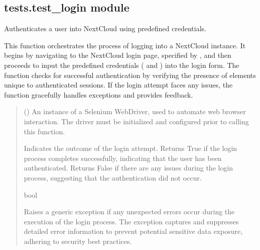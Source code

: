 \documentclass[letterpaper,10pt,english]{sphinxmanual}
\begin{document}
\subsection{tests.test\_login module}
\label{\detokenize{tests:module-tests.test_login}}\label{\detokenize{tests:tests-test-login-module}}

\begin{fulllineitems}
\label{\detokenize{tests:tests.test_login.login}}
\pysigstartsignatures
{}
\pysigstopsignatures
\sphinxAtStartPar
Authenticates a user into NextCloud using predefined credentials.

\sphinxAtStartPar
This function orchestrates the process of logging into a NextCloud instance. It begins by navigating to the 
NextCloud login page, specified by , and then proceeds to input the predefined credentials 
( and ) into the login form. The function checks for successful authentication by verifying 
the presence of elements unique to authenticated sessions. If the login attempt faces any issues, the function 
gracefully handles exceptions and provides feedback.
\begin{quote}\begin{description}
\sphinxAtStartPar
{} () \textendash{} An instance of a Selenium WebDriver, used to automate web browser interaction.
The driver must be initialized and configured prior to calling this function.

\sphinxAtStartPar
Indicates the outcome of the login attempt. Returns True if the login process completes successfully, 
indicating that the user has been authenticated. Returns False if there are any issues during the 
login process, suggesting that the authentication did not occur.

\sphinxAtStartPar
bool

\sphinxAtStartPar
{} \textendash{} Raises a generic exception if any unexpected errors occur during the execution of the login 
process. The exception captures and suppresses detailed error information to prevent potential 
sensitive data exposure, adhering to security best practices.


\end{description}
\end{quote}
\end{fulllineitems}
\end{document}
